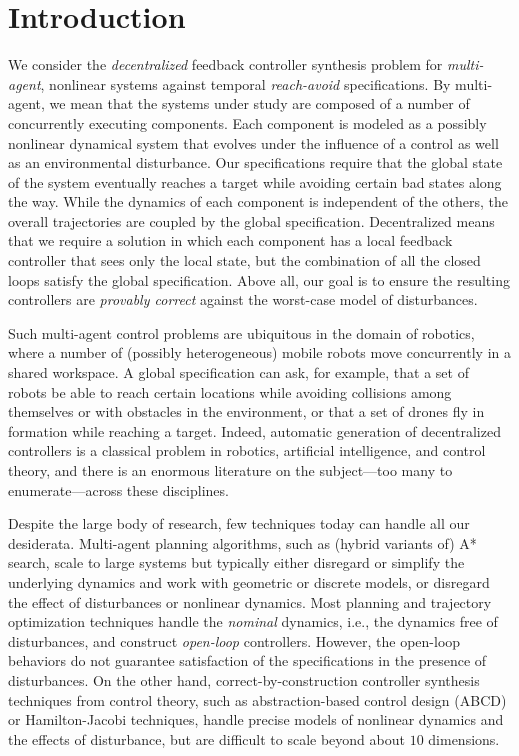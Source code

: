 
\section{Introduction}
\label{sec:intro}
We consider the \emph{decentralized} feedback controller synthesis problem for \emph{multi-agent}, nonlinear systems against temporal \emph{reach-avoid} specifications.
%
By multi-agent, we mean that the systems under study are composed of a number of concurrently executing components.
Each component is modeled as a possibly nonlinear dynamical system that evolves under the influence of a control as well as an environmental
disturbance.
Our specifications require that the global state of the system eventually reaches a target while avoiding certain bad states along the way.
While the dynamics of each component is independent of the others, the overall trajectories are coupled by the global specification.
Decentralized means that we require a solution in which each component has a local feedback controller that sees only the local
state, but the combination of all the closed loops satisfy the global specification.
Above all, our goal is to ensure the resulting controllers are \emph{provably correct} against the worst-case model of disturbances.

Such multi-agent control problems are ubiquitous in the domain of robotics, where a number of 
(possibly heterogeneous) mobile robots move concurrently in a shared workspace.
A global specification can ask, for example, that a set of robots be able to reach certain locations while avoiding collisions among themselves
or with obstacles in the environment,
or that a set of drones fly in formation while reaching a target.
Indeed, automatic generation of decentralized controllers is a classical problem in robotics, artificial intelligence, and control theory, 
and there is an enormous literature on the subject---too many to enumerate---across these disciplines.

Despite the large body of research, few techniques today can handle all our desiderata.
Multi-agent planning algorithms, such as (hybrid variants of) A* search, scale to large systems but typically either disregard or simplify the 
underlying dynamics and work with geometric or discrete models, or disregard the effect of disturbances or nonlinear dynamics.
Most planning and trajectory optimization techniques handle the \emph{nominal} dynamics, i.e., the dynamics free of disturbances,
and construct \emph{open-loop} controllers.
However, the open-loop behaviors do not guarantee satisfaction of the specifications in the presence of disturbances.
On the other hand, correct-by-construction controller synthesis techniques from control theory, 
such as abstraction-based control design (ABCD) or Hamilton-Jacobi techniques,
handle precise models of nonlinear dynamics and the effects of disturbance, but are difficult to scale beyond about $10$ dimensions.

